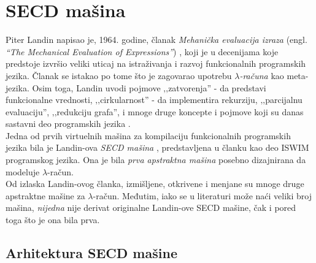 \section{SECD mašina}
\label{sec:secd-masina}

%

Piter Landin napisao je, 1964. godine, članak {\em Mehanička evaluacija izraza} (engl. \textit{“The Mechanical Evaluation of Expressions”}) \cite{landinsecd}, koji je u decenijama koje predstoje izvršio veliki uticaj na istraživanja i razvoj funkcionalnih programskih jezika. Članak se istakao po tome što je zagovarao upotrebu {\em $\lambda$-računa} kao meta-jezika. Osim toga, Landin uvodi pojmove ‚‚zatvorenja'' - da predstavi funkcionalne vrednosti, ‚‚cirkularnost'' - da implementira rekurziju, ‚‚parcijalnu evaluaciju'', ‚‚redukciju grafa'', i mnoge druge koncepte i pojmove koji su danas sastavni deo programskih jezika \cite{calls-lambda, compiler-design}.\\

Jedna od prvih virtuelnih mašina za kompilaciju funkcionalnih programskih jezika bila je Landin-ova {\em SECD mašina} \cite{landin-secd}, predstavljena u članku kao deo ISWIM \cite{ISWIM} programskog jezika. Ona je bila {\em prva apstraktna mašina} posebno dizajnirana da modeluje $\lambda$-račun. \\

Od izlaska Landin-ovog članka, izmišljene, otkrivene i menjane su mnoge druge apstraktne mašine za $\lambda$-račun. Međutim, iako se u literaturi može naći veliki broj mašina, {\em nijedna} nije derivat originalne Landin-ove SECD mašine, čak i pored toga što je ona bila prva.


\subsection{Arhitektura SECD mašine}

